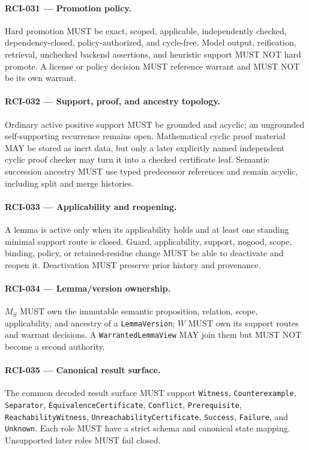 \documentclass[11pt]{article}
\begin{document}
\paragraph{RCI-031 --- Promotion policy.}
Hard promotion MUST be exact, scoped, applicable, independently checked,
dependency-closed, policy-authorized, and cycle-free. Model output, reification,
retrieval, unchecked backend assertions, and heuristic support MUST NOT hard
promote. A license or policy decision MUST reference warrant and MUST NOT be its
own warrant.

\paragraph{RCI-032 --- Support, proof, and ancestry topology.}
Ordinary active positive support MUST be grounded and acyclic; an ungrounded
self-supporting recurrence remains open. Mathematical cyclic proof material MAY
be stored as inert data, but only a later explicitly named independent cyclic
proof checker may turn it into a checked certificate leaf. Semantic succession
ancestry MUST use typed predecessor references and remain acyclic, including
split and merge histories.

\paragraph{RCI-033 --- Applicability and reopening.}
A lemma is active only when its applicability holds and at least one standing
minimal support route is closed. Guard, applicability, support, nogood, scope,
binding, policy, or retained-residue change MUST be able to deactivate and
reopen it. Deactivation MUST preserve prior history and provenance.

\paragraph{RCI-034 --- Lemma/version ownership.}
\(M_S\) MUST own the immutable semantic proposition, relation, scope,
applicability, and ancestry of a \texttt{LemmaVersion}; \(W\) MUST own its
support routes and warrant decisions. A \texttt{WarrantedLemmaView} MAY join
them but MUST NOT become a second authority.

\paragraph{RCI-035 --- Canonical result surface.}
The common decoded result surface MUST support \texttt{Witness},
\texttt{Counterexample}, \texttt{Separator},
\texttt{EquivalenceCertificate}, \texttt{Conflict},
\texttt{Prerequisite}, \texttt{ReachabilityWitness},
\texttt{UnreachabilityCertificate}, \texttt{Success}, \texttt{Failure}, and
\texttt{Unknown}. Each role MUST have a strict schema and canonical state
mapping. Unsupported later roles MUST fail closed.
\end{document}
